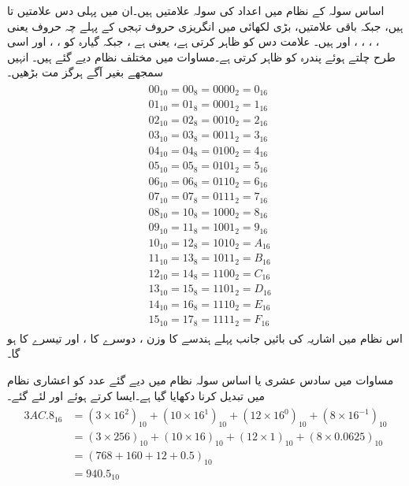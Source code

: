 	اساس سولہ کے نظام میں اعداد کی  سولہ علامتیں ہیں۔ان میں پہلی دس علامتیں   تا  ہیں،   جبکہ  باقی علامتیں،    بڑی لکھائی میں انگریزی حروف  تہجی کے پہلے چہ حروف یعنی  ، ، ، ،  اور    ہیں۔  علامت    دس   کو ظاہر کرتی ہے،  یعنی  ہے ، جبکہ   گیارہ کو  ، ،  اور اسی طرح چلتے ہوئے   پندرہ کو ظاہر کرتی ہے۔مساوات    میں مختلف نظام  دیے   گئے ہیں۔ انہیں سمجھے  بغیر  آگے  ہرگز مت بڑھیں۔  
\begin{gather}
\begin{aligned}\label{مساوات_ثنائی_تمام}
&00_{10}=00_8=0000_2=0_{16}\\
&01_{10}=01_8=0001_2=1_{16}\\
&02_{10}=02_8=0010_2=2_{16}\\
&03_{10}=03_8=0011_2=3_{16}\\
&04_{10}=04_8=0100_2=4_{16}\\
&05_{10}=05_8=0101_2=5_{16}\\
&06_{10}=06_8=0110_2=6_{16}\\
&07_{10}=07_8=0111_2=7_{16}\\
&08_{10}=10_8=1000_2=8_{16}\\
&09_{10}=11_8=1001_2=9_{16}\\
&10_{10}=12_8=1010_2=A_{16}\\
&11_{10}=13_8=1011_2=B_{16}\\
&12_{10}=14_8=1100_2=C_{16}\\
&13_{10}=15_8=1101_2=D_{16}\\
&14_{10}=16_8=1110_2=E_{16}\\
&15_{10}=17_8=1111_2=F_{16}
\end{aligned}
\end{gather}
	اس نظام میں اشاریہ کی  بائیں جانب  پہلے ہندسے کا وزن    ،  دوسرے  کا   ،  اور تیسرے کا  ہو گا۔ 

مساوات     میں سادس عشری یا اساس سولہ  نظام میں دیے گئے عدد کو اعشاری نظام میں تبدیل کرنا دکھایا گیا ہے۔ایسا کرتے ہوئے   اور   لئے گئے۔
\begin{gather}
\begin{aligned}\label{مساوات_ثنائی_سادس}
3AC.8_{16}&=(3\times 16^2)_{10}+(10\times 16^1)_{10}+(12\times 16^0)_{10}+(8\times 16^{-1})_{10}\\
&=(3\times 256)_{10}+(10\times 16)_{10}+(12\times 1)_{10}+(8\times 0.0625)_{10}\\
&=(768+160+12+0.5)_{10}\\
&=940.5_{10}
\end{aligned}
\end{gather}

